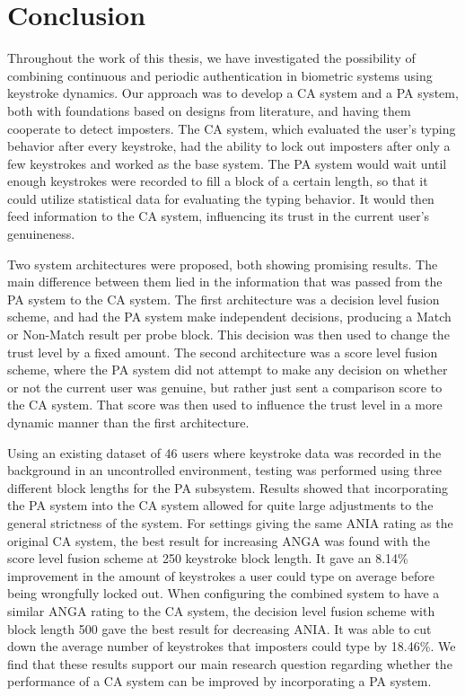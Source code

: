 \chapter{Conclusion}
\label{chap:conclusion}
Throughout the work of this thesis, we have investigated the possibility of combining continuous and periodic authentication in biometric systems using keystroke dynamics.
Our approach was to develop a CA system and a PA system, both with foundations based on designs from literature, and having them cooperate to detect imposters.
The CA system, which evaluated the user's typing behavior after every keystroke, had the ability to lock out imposters after only a few keystrokes and worked as the base system.
The PA system would wait until enough keystrokes were recorded to fill a block of a certain length, so that it could utilize statistical data for evaluating the typing behavior.
It would then feed information to the CA system, influencing its trust in the current user's genuineness.

Two system architectures were proposed, both showing promising results.
The main difference between them lied in the information that was passed from the PA system to the CA system.
The first architecture was a decision level fusion scheme, and had the PA system make independent decisions, producing a Match or Non-Match result per probe block.
This decision was then used to change the trust level by a fixed amount.
The second architecture was a score level fusion scheme, where the PA system did not attempt to make any decision on whether or not the current user was genuine, but rather just sent a comparison score to the CA system.
That score was then used to influence the trust level in a more dynamic manner than the first architecture.

Using an existing dataset of 46 users where keystroke data was recorded in the background in an uncontrolled environment, testing was performed using three different block lengths for the PA subsystem.
Results showed that incorporating the PA system into the CA system allowed for quite large adjustments to the general strictness of the system.
For settings giving the same ANIA rating as the original CA system, the best result for increasing ANGA was found with the score level fusion scheme at 250 keystroke block length.
It gave an 8.14\% improvement in the amount of keystrokes a user could type on average before being wrongfully locked out.
When configuring the combined system to have a similar ANGA rating to the CA system, the decision level fusion scheme with block length 500 gave the best result for decreasing ANIA.
It was able to cut down the average number of keystrokes that imposters could type by 18.46\%.
We find that these results support our main research question regarding whether the performance of a CA system can be improved by incorporating a PA system.


